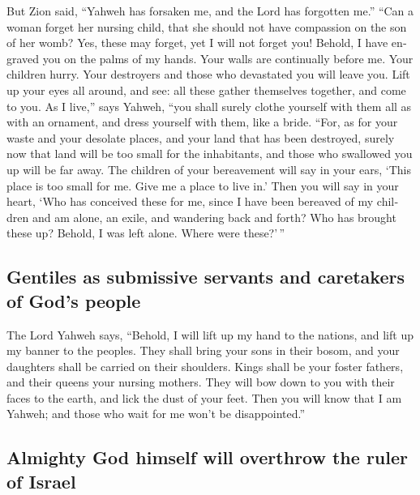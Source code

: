 \begin{paracol}{2}
\begin{otherlanguage}{english}
 But Zion said, ``Yahweh has forsaken me, and the Lord
has forgotten me.''  ``Can a woman forget her nursing
child, that she should not have compassion on the son of her womb? Yes,
these may forget, yet I will not forget you!  Behold, I
have engraved you on the palms of my hands. Your walls are continually
before me.  Your children hurry. Your destroyers and
those who devastated you will leave you.  Lift up your
eyes all around, and see: all these gather themselves together, and come
to you. As I live,'' says Yahweh, ``you shall surely clothe yourself
with them all as with an ornament, and dress yourself with them, like a
bride.  ``For, as for your waste and your desolate
places, and your land that has been destroyed, surely now that land will
be too small for the inhabitants, and those who swallowed you up will be
far away.  The children of your bereavement will say in
your ears, `This place is too small for me. Give me a place to live in.'
 Then you will say in your heart, `Who has conceived
these for me, since I have been bereaved of my children and am alone, an
exile, and wandering back and forth? Who has brought these up? Behold, I
was left alone. Where were these?'\,''

\hypertarget{gentiles-as-submissive-servants-and-caretakers-of-gods-people}{%
\subsection{Gentiles as submissive servants and caretakers of God's
people}\label{gentiles-as-submissive-servants-and-caretakers-of-gods-people}}

 The Lord Yahweh says, ``Behold, I will lift up my hand
to the nations, and lift up my banner to the peoples. They shall bring
your sons in their bosom, and your daughters shall be carried on their
shoulders.  Kings shall be your foster fathers, and their
queens your nursing mothers. They will bow down to you with their faces
to the earth, and lick the dust of your feet. Then you will know that I
am Yahweh; and those who wait for me won't be disappointed.''

\hypertarget{almighty-god-himself-will-overthrow-the-ruler-of-israel}{%
\subsection{Almighty God himself will overthrow the ruler of
Israel}\label{almighty-god-himself-will-overthrow-the-ruler-of-israel}}


\end{otherlanguage}
\end{paracol}
